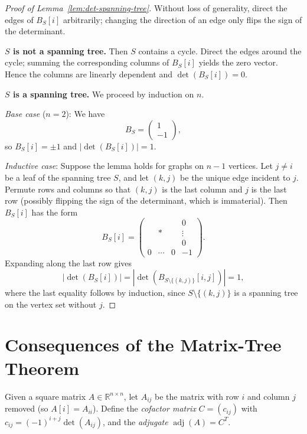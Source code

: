 \documentclass[12pt]{article}
\theoremstyle{remark}
\newcommand{\R}{\mathbb{R}}
\newcommand{\adj}{\operatorname{adj}}
\begin{document}
\begin{proof}[Proof of Lemma~\ref{lem:det-spanning-tree}]
Without loss of generality, direct the edges of $B_S[i]$ arbitrarily; changing
the direction of an edge only flips the sign of the determinant.

\medskip
\noindent\textbf{$S$ is not a spanning tree.} Then $S$ contains a cycle. Direct the edges
around the cycle; summing the corresponding columns of $B_S[i]$ yields the zero vector.
Hence the columns are linearly dependent and $\det(B_S[i]) = 0$.

\medskip
\noindent\textbf{$S$ is a spanning tree.} We proceed by induction on $n$.

\emph{Base case} ($n = 2$): We have
\[
  B_S = \begin{pmatrix} 1 \\ -1 \end{pmatrix},
\]
so $B_S[i] = \pm 1$ and $|\det(B_S[i])| = 1$.

\emph{Inductive case}: Suppose the lemma holds for graphs on $n-1$ vertices. Let $j \neq i$
be a leaf of the spanning tree $S$, and let $(k,j)$ be the unique edge incident to $j$.
Permute rows and columns so that $(k,j)$ is the last column and $j$ is the last row (possibly
flipping the sign of the determinant, which is immaterial). Then $B_S[i]$ has the form
\[
  B_S[i] = \left(
    \begin{array}{ccc|c}
     & & & 0 \\
     & \ast & & \vdots \\
     & & & 0 \\
    \hline
    0 & \cdots & 0 & -1
    \end{array}
  \right).
\]
Expanding along the last row gives
\[
  |\det(B_S[i])| = |\det(B_{S\setminus\{(k,j)\}}[i,j])| = 1,
\]
where the last equality follows by induction, since $S \setminus \{(k,j)\}$ is a spanning
tree on the vertex set without $j$.
\end{proof}

\section{Consequences of the Matrix-Tree Theorem}

Given a square matrix $A \in \R^{n \times n}$, let $A_{ij}$ be the matrix with row $i$
and column $j$ removed (so $A[i] = A_{ii}$). Define the \emph{cofactor matrix}
$C = (c_{ij})$ with $c_{ij} = (-1)^{i+j}\det(A_{ij})$, and the \emph{adjugate}
$\adj(A) = C^T$.
\end{document}
